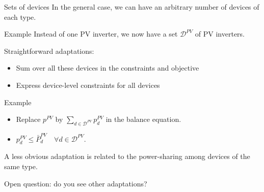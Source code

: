 \begin{frame}[allowframebreaks]{Sets of devices}
In the general case, we can have an arbitrary number of devices of each type.
\begin{block}{Example}
Instead of one PV inverter, we now have a set $\mathcal{D}^{PV}$ of PV inverters.
\end{block}

Straightforward adaptations: 
\begin{itemize}
    \item Sum over all these devices in the constraints and objective
    \item Express device-level constraints for all devices
\end{itemize}

\begin{block}{Example}
\begin{itemize}
    \item Replace $p^{PV}$ by $\sum_{d \in \mathcal{D}^{PV}} p^{PV}_d$ in the balance equation.
    \item $p^{PV}_d \leq \bar{P}^{PV}_d \quad \forall d \in \mathcal{D}^{PV}$.
\end{itemize}
    
\end{block}

A less obvious adaptation is related to the power-sharing among devices of the same type.

Open question: do you see other adaptations? 
\end{frame}

